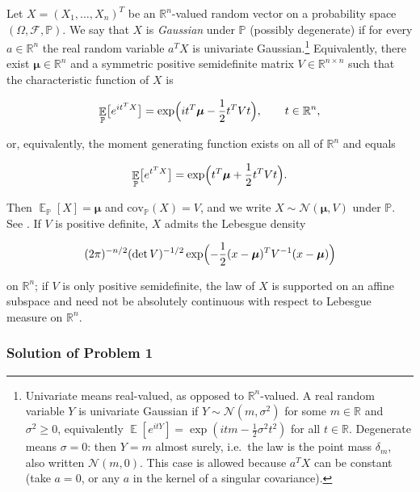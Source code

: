 \documentclass[11pt,a4paper]{article}
\DeclareMathOperator{\E}{\mathbb{E}}
\begin{document}
\begin{definition}
\label{def:gaussian-random-vector}
Let \(X = (X_{1}, \dots, X_{n})^{T}\) be an \(\mathbb{R}^{n}\)-valued random vector on a probability space \((\Omega, \mathcal{F}, \mathbb{P})\). We say that \(X\) is \emph{Gaussian} under \(\mathbb{P}\) (possibly degenerate) if for every \(a \in \mathbb{R}^{n}\) the real random variable \(a^{T} X\) is univariate Gaussian.\footnote{Univariate means real-valued, as opposed to \(\mathbb{R}^{n}\)-valued. A real random variable \(Y\) is univariate Gaussian if \(Y\sim\mathcal{N}(m,\sigma^{2})\) for some \(m\in\mathbb{R}\) and \(\sigma^{2}\ge 0\), equivalently \(\E[e^{itY}]=\exp(itm-\tfrac12\sigma^{2}t^{2})\) for all \(t\in\mathbb{R}\). Degenerate means \(\sigma=0\): then \(Y=m\) almost surely, i.e.\ the law is the point mass \(\delta_{m}\), also written \(\mathcal{N}(m,0)\). This case is allowed because \(a^{T}X\) can be constant (take \(a=0\), or any \(a\) in the kernel of a singular covariance).} Equivalently, there exist \(\bm{\mu} \in \mathbb{R}^{n}\) and a symmetric positive semidefinite matrix \(V \in \mathbb{R}^{n \times n}\) such that the characteristic function of \(X\) is

\[
\E_{\mathbb{P}}\bigl[e^{i t^{T} X}\bigr]
=
\exp\Bigl(i t^{T} \bm{\mu} - \frac{1}{2} t^{T} V t\Bigr),
\qquad
t \in \mathbb{R}^{n},
\]

or, equivalently, the moment generating function exists on all of \(\mathbb{R}^{n}\) and equals

\[
\E_{\mathbb{P}}\bigl[e^{t^{T} X}\bigr]
=
\exp\Bigl(t^{T} \bm{\mu} + \frac{1}{2} t^{T} V t\Bigr).
\]

Then \(\E_{\mathbb{P}}[X] = \bm{\mu}\) and \(\mathrm{cov}_{\mathbb{P}}(X) = V\), and we write \(X \sim \mathcal{N}(\bm{\mu}, V)\) under \(\mathbb{P}\). See \citep[\S3.3, \S3.9]{durrett2010}. If \(V\) is positive definite, \(X\) admits the Lebesgue density

\[
(2\pi)^{-n/2} (\det V)^{-1/2}
\exp\Bigl(
-\frac{1}{2} (x - \bm{\mu})^{T} V^{-1} (x - \bm{\mu})
\Bigr)
\]

on \(\mathbb{R}^{n}\); if \(V\) is only positive semidefinite, the law of \(X\) is supported on an affine subspace and need not be absolutely continuous with respect to Lebesgue measure on \(\mathbb{R}^{n}\).
\end{definition}

\subsubsection{Solution of Problem 1}
\end{document}
